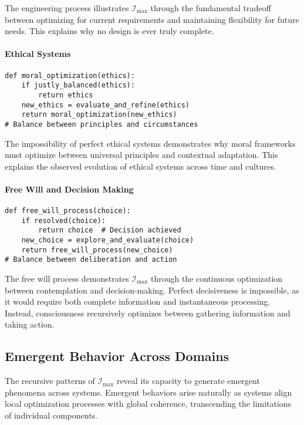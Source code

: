 \documentclass[12pt]{article}
\begin{document}
The engineering process illustrates $\mathcal{I}_{\text{max}}$ through the fundamental tradeoff between optimizing for current requirements and maintaining flexibility for future needs. This explains why no design is ever truly complete.

\paragraph{Ethical Systems}
\begin{verbatim}
def moral_optimization(ethics):
    if justly_balanced(ethics):
        return ethics
    new_ethics = evaluate_and_refine(ethics)
    return moral_optimization(new_ethics)
# Balance between principles and circumstances
\end{verbatim}

The impossibility of perfect ethical systems demonstrates why moral frameworks must optimize between universal principles and contextual adaptation. This explains the observed evolution of ethical systems across time and cultures.

\paragraph{Free Will and Decision Making}
\begin{verbatim}
def free_will_process(choice):
    if resolved(choice):
        return choice  # Decision achieved
    new_choice = explore_and_evaluate(choice)
    return free_will_process(new_choice)
# Balance between deliberation and action
\end{verbatim}

The free will process demonstrates \(\mathcal{I}_{\text{max}}\) through the continuous optimization between contemplation and decision-making. Perfect decisiveness is impossible, as it would require both complete information and instantaneous processing. Instead, consciousness recursively optimizes between gathering information and taking action.

\subsection{Emergent Behavior Across Domains}
The recursive patterns of \(\mathcal{I}_{\text{max}}\) reveal its capacity to generate emergent phenomena across systems. Emergent behaviors arise naturally as systems align local optimization processes with global coherence, transcending the limitations of individual components.
\end{document}
